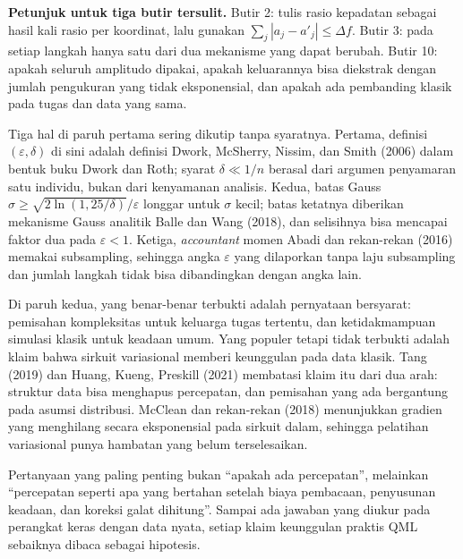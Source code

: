 \begin{latihan}
\noindent\textbf{Petunjuk untuk tiga butir tersulit.} Butir 2: tulis rasio kepadatan
sebagai hasil kali rasio per koordinat, lalu gunakan $\sum_j|a_j-a'_j|\le\Delta f$.
Butir 3: pada setiap langkah hanya satu dari dua mekanisme yang dapat berubah. Butir 10:
apakah seluruh amplitudo dipakai, apakah keluarannya bisa diekstrak dengan jumlah
pengukuran yang tidak eksponensial, dan apakah ada pembanding klasik pada tugas dan data
yang sama.
\end{latihan}

\begin{untukpeneliti}
Tiga hal di paruh pertama sering dikutip tanpa syaratnya. Pertama, definisi
$(\varepsilon,\delta)$ di sini adalah definisi Dwork, McSherry, Nissim, dan Smith (2006)
dalam bentuk buku Dwork dan Roth; syarat $\delta\ll 1/n$ berasal dari argumen penyamaran
satu individu, bukan dari kenyamanan analisis. Kedua, batas Gauss
$\sigma\ge\sqrt{2\ln(1{,}25/\delta)}/\varepsilon$ longgar untuk $\sigma$ kecil; batas
ketatnya diberikan mekanisme Gauss analitik Balle dan Wang (2018), dan selisihnya bisa
mencapai faktor dua pada $\varepsilon<1$. Ketiga, \emph{accountant} momen Abadi dan
rekan-rekan (2016) memakai subsampling, sehingga angka $\varepsilon$ yang dilaporkan
tanpa laju subsampling dan jumlah langkah tidak bisa dibandingkan dengan angka lain.

Di paruh kedua, yang benar-benar terbukti adalah pernyataan bersyarat: pemisahan
kompleksitas untuk keluarga tugas tertentu, dan ketidakmampuan simulasi klasik untuk
keadaan umum. Yang populer tetapi tidak terbukti adalah klaim bahwa sirkuit variasional
memberi keunggulan pada data klasik. Tang (2019) dan Huang, Kueng, Preskill (2021)
membatasi klaim itu dari dua arah: struktur data bisa menghapus percepatan, dan
pemisahan yang ada bergantung pada asumsi distribusi. McClean dan rekan-rekan (2018)
menunjukkan gradien yang menghilang secara eksponensial pada sirkuit dalam, sehingga
pelatihan variasional punya hambatan yang belum terselesaikan.

Pertanyaan yang paling penting bukan ``apakah ada percepatan'', melainkan ``percepatan
seperti apa yang bertahan setelah biaya pembacaan, penyusunan keadaan, dan koreksi galat
dihitung''. Sampai ada jawaban yang diukur pada perangkat keras dengan data nyata,
setiap klaim keunggulan praktis QML sebaiknya dibaca sebagai hipotesis.
\end{untukpeneliti}


